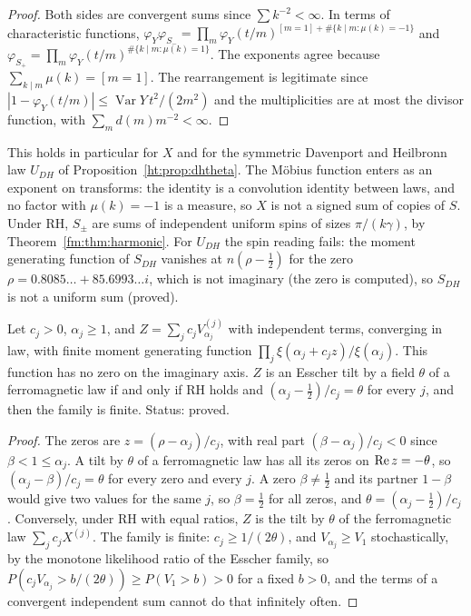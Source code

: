 \begin{proof}
Both sides are convergent sums since $\sum k^{-2}<\infty$. In terms of characteristic functions, $\varphi_Y\varphi_{S_-}=\prod_m\varphi_Y(t/m)^{[m=1]+\#\{k\mid m:\mu(k)=-1\}}$ and $\varphi_{S_+}=\prod_m\varphi_Y(t/m)^{\#\{k\mid m:\mu(k)=1\}}$. The exponents agree because $\sum_{k\mid m}\mu(k)=[m=1]$. The rearrangement is legitimate since $|1-\varphi_Y(t/m)|\le\operatorname{Var}Y\,t^2/(2m^2)$ and the multiplicities are at most the divisor function, with $\sum_md(m)m^{-2}<\infty$.
\end{proof}

This holds in particular for $X$ and for the symmetric Davenport and Heilbronn law $U_{DH}$ of Proposition~\ref{ht:prop:dhtheta}. The M\"obius function enters as an exponent on transforms: the identity is a convolution identity between laws, and no factor with $\mu(k)=-1$ is a measure, so $X$ is not a signed sum of copies of $S$. Under RH, $S_\pm$ are sums of independent uniform spins of sizes $\pi/(k\gamma)$, by Theorem~\ref{fm:thm:harmonic}. For $U_{DH}$ the spin reading fails: the moment generating function of $S_{DH}$ vanishes at $n(\rho-\frac12)$ for the zero $\rho=0.8085\ldots+85.6993\ldots i$, which is not imaginary (the zero is computed), so $S_{DH}$ is not a uniform sum (proved).

\begin{proposition}\label{fm:prop:weights}
Let $c_j>0$, $\alpha_j\ge1$, and $Z=\sum_jc_jV^{(j)}_{\alpha_j}$ with independent terms, converging in law, with finite moment generating function $\prod_j\xi(\alpha_j+c_jz)/\xi(\alpha_j)$. This function has no zero on the imaginary axis. $Z$ is an Esscher tilt by a field $\theta$ of a ferromagnetic law if and only if RH holds and $(\alpha_j-\frac12)/c_j=\theta$ for every $j$, and then the family is finite. Status: proved.
\end{proposition}

\begin{proof}
The zeros are $z=(\rho-\alpha_j)/c_j$, with real part $(\beta-\alpha_j)/c_j<0$ since $\beta<1\le\alpha_j$. A tilt by $\theta$ of a ferromagnetic law has all its zeros on $\operatorname{Re} z=-\theta$, so $(\alpha_j-\beta)/c_j=\theta$ for every zero and every $j$. A zero $\beta\neq\frac12$ and its partner $1-\beta$ would give two values for the same $j$, so $\beta=\frac12$ for all zeros, and $\theta=(\alpha_j-\frac12)/c_j$. Conversely, under RH with equal ratios, $Z$ is the tilt by $\theta$ of the ferromagnetic law $\sum_jc_jX^{(j)}$. The family is finite: $c_j\ge1/(2\theta)$, and $V_{\alpha_j}\ge V_1$ stochastically, by the monotone likelihood ratio of the Esscher family, so $P(c_jV_{\alpha_j}>b/(2\theta))\ge P(V_1>b)>0$ for a fixed $b>0$, and the terms of a convergent independent sum cannot do that infinitely often.
\end{proof}

